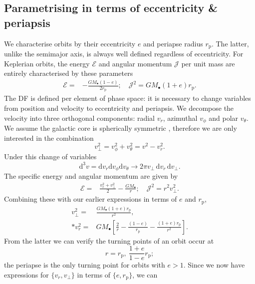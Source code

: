 \documentclass[useAMS,usedcolumn,usegraphicx,usenatbib]{mn2e}
\newcommand{\sub}[1]{\ensuremath{_\mathrm{#1}}}
\newcommand{\dd}{\ensuremath{\mathrm{d}}}
\begin{document}
\subsection{Parametrising in terms of eccentricity \& periapsis}

We characterise orbits by their eccentricity $e$ and periapse radius $r\sub{p}$. The latter, unlike the semimajor axis, is always well defined regardless of eccentricity. For Keplerian orbits, the energy $\mathcal{E}$ and angular momentum $\mathcal{J}$ per unit mass are entirely characterised by these parameters
\begin{align}
\label{eq:Energy_ecc}
\mathcal{E} = {} & -\frac{GM_\bullet(1 - e)}{2r\sub{p}}; \quad \mathcal{J}^2 = GM_\bullet(1 + e)r\sub{p}.
\end{align}
The DF is defined per element of phase space: it is necessary to change variables from position and velocity to eccentricity and periapsis. We decompose the velocity into three orthogonal components: radial $v_r$, azimuthal $v_\phi$ and polar $v_\theta$. We assume the galactic core is spherically symmetric \citep{Genzel2003, Schodel2007}, therefore we are only interested in the combination
\begin{equation}
v_\perp^2 = v_\phi^2 + v_\theta^2 = v^2 - v_r^2.
\end{equation}
Under this change of variables
\begin{equation}
\dd^3v = \dd v_r \dd v_\phi \dd v_\theta \rightarrow 2\pi v_\perp \,\dd v_r \,\dd v_\perp.
\end{equation}
The specific energy and angular momentum are given by
\begin{align}
\mathcal{E} = {} & \frac{v_r^2 + v_\perp^2}{2} - \frac{GM_\bullet}{r}; \quad \mathcal{J}^2 = r^2 v_\perp^2.
\end{align}
Combining these with our earlier expressions in terms of $e$ and $r\sub{p}$,
\begin{align}
v_\perp^2 = {} & \frac{GM_\bullet(1 + e)r\sub{p}}{r^2}, \\*
v_r^2 = {} & GM_\bullet\left[\frac{2}{r} - \frac{(1 - e)}{r\sub{p}} - \frac{(1 + e)r\sub{p}}{r^2}\right].
\end{align}
From the latter we can verify the turning points of an orbit occur at
\begin{equation}
r = r\sub{p}, \: \frac{1+e}{1-e}r\sub{p};
\end{equation}
the periapse is the only turning point for orbits with $e > 1$. Since we now have expressions for $\{v_r, v_\perp\}$ in terms of $\{e, r\sub{p}\}$, we can 
\end{document}
